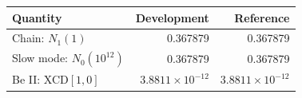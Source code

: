\begin{tabular}{lrr}\toprule Quantity & Development & Reference\\\midrule
Chain: $N_1(1)$ & 0.367879 & 0.367879\\
Slow mode: $N_0(10^{12})$ & 0.367879 & 0.367879\\
Be II: XCD$[1,0]$ & $3.8811\times10^{-12}$ & $3.8811\times10^{-12}$\\
\bottomrule\end{tabular}
